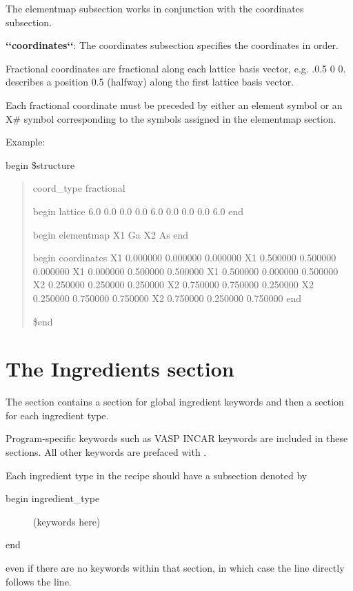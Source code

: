 \documentclass[letterpaper,10pt,english]{sphinxmanual}
\begin{document}
The elementmap subsection works in conjunction with the coordinates subsection.

\textbf{{}`{}`coordinates{}`{}`}: The coordinates subsection specifies the coordinates in order.

Fractional coordinates are fractional along each lattice basis vector, e.g. .0.5 0 0. describes a position 0.5 (halfway) along the first lattice basis vector.

Each fractional coordinate must be preceded by either an element symbol or an X\# symbol corresponding to the symbols assigned in the elementmap section.

Example:

begin \$structure
\begin{quote}

coord\_type fractional

begin lattice
6.0 0.0 0.0
0.0 6.0 0.0
0.0 0.0 6.0
end

begin elementmap
X1 Ga
X2 As
end

begin coordinates
X1 0.000000 0.000000 0.000000
X1 0.500000 0.500000 0.000000
X1 0.000000 0.500000 0.500000
X1 0.500000 0.000000 0.500000
X2 0.250000 0.250000 0.250000
X2 0.750000 0.750000 0.250000
X2 0.250000 0.750000 0.750000
X2 0.750000 0.250000 0.750000
end

\$end
\end{quote}


\section{The Ingredients section}
\label{3_0_inputfile:the-ingredients-section}
The  section contains a section for global ingredient keywords and then a section for each ingredient type.

Program-specific keywords such as VASP INCAR keywords are included in these sections. All other keywords are prefaced with .

Each ingredient type in the recipe should have a subsection denoted by
\begin{description}
\item[{begin ingredient\_type}] \leavevmode
(keywords here)

\end{description}

end

even if there are no keywords within that section, in which case the  line directly follows the  line.
\end{document}
